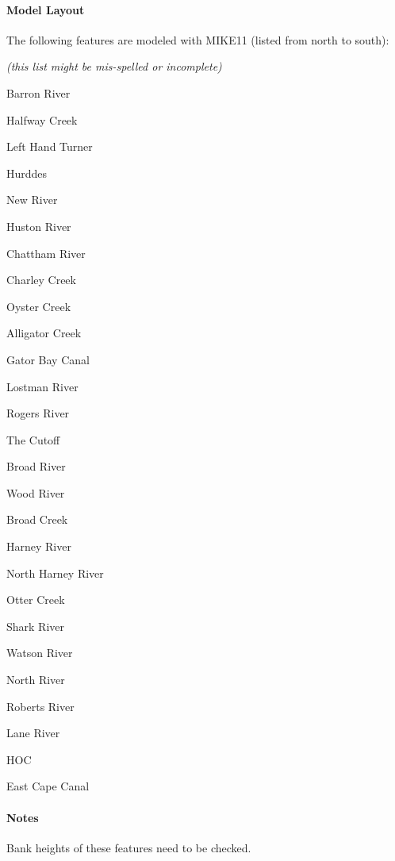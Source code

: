 \paragraph{Model Layout}
The following features are modeled with MIKE11 (listed from north to south):
\begin{packed_items}
\item \emph{(this list might be mis-spelled or incomplete)}
\item Barron River
\item Halfway Creek
\item Left Hand Turner
\item Hurddes
\item New River
\item Huston River
\item Chattham River
\item Charley Creek
\item Oyster Creek
\item Alligator Creek
\item Gator Bay Canal
\item Lostman River
\item Rogers River
\item The Cutoff
\item Broad River
\item Wood River
\item Broad Creek
\item Harney River
\item North Harney River
\item Otter Creek
\item Shark River
\item Watson River
\item North River
\item Roberts River
\item Lane River
\item HOC
\item East Cape Canal
\end{packed_items}

\begin{notes}
\paragraph{Notes}
Bank heights of these features need to be checked.
\end{notes}



\clearpage

